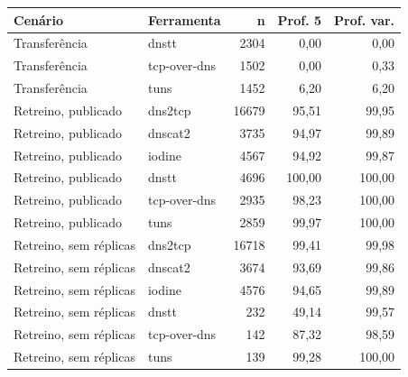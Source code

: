 \begin{tabular}{llrrr}
\hline
\textbf{Cenário} & \textbf{Ferramenta} & \textbf{n} & \textbf{Prof. 5} & \textbf{Prof. var.} \\ \hline
Transferência & dnstt & 2304 & 0,00 & 0,00 \\
Transferência & tcp-over-dns & 1502 & 0,00 & 0,33 \\
Transferência & tuns & 1452 & 6,20 & 6,20 \\
\hline
Retreino, publicado & dns2tcp & 16679 & 95,51 & 99,95 \\
Retreino, publicado & dnscat2 & 3735 & 94,97 & 99,89 \\
Retreino, publicado & iodine & 4567 & 94,92 & 99,87 \\
Retreino, publicado & dnstt & 4696 & 100,00 & 100,00 \\
Retreino, publicado & tcp-over-dns & 2935 & 98,23 & 100,00 \\
Retreino, publicado & tuns & 2859 & 99,97 & 100,00 \\
\hline
Retreino, sem réplicas & dns2tcp & 16718 & 99,41 & 99,98 \\
Retreino, sem réplicas & dnscat2 & 3674 & 93,69 & 99,86 \\
Retreino, sem réplicas & iodine & 4576 & 94,65 & 99,89 \\
Retreino, sem réplicas & dnstt & 232 & 49,14 & 99,57 \\
Retreino, sem réplicas & tcp-over-dns & 142 & 87,32 & 98,59 \\
Retreino, sem réplicas & tuns & 139 & 99,28 & 100,00 \\
\hline
\end{tabular}

